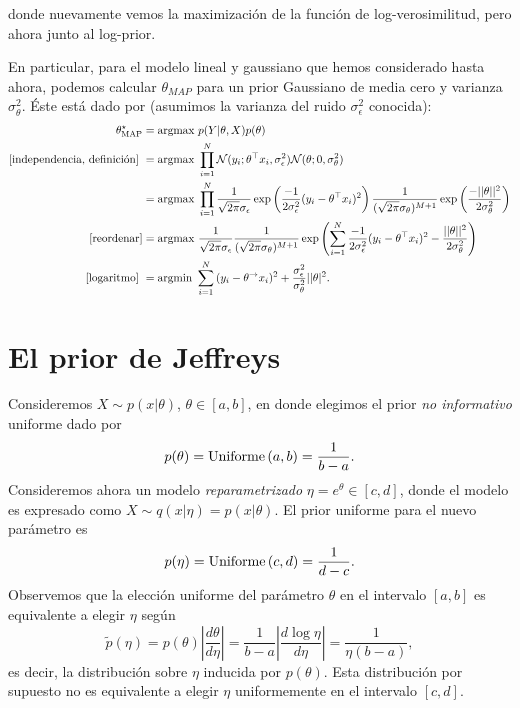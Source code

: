 donde  nuevamente vemos la maximización de  la función de log-verosimilitud, pero ahora junto al log-prior.

\begin{example}
En particular, para el modelo lineal y gaussiano que hemos considerado hasta ahora, podemos calcular $\theta_{MAP}$ para un prior Gaussiano de media cero y varianza $\sigma_\theta^2$. Éste está dado por (asumimos la varianza del ruido $\sigma_\epsilon^2$ conocida):	
\begin{align}
	\theta_\text{MAP}^\star 	&= \text{argmax } p(Y|\theta,X)p(\theta)\nonumber\\
	\text{[independencia, definición]}\ &= \text{argmax } \prod_{i=1}^N {\mathcal N}(y_i;\theta^\top x_i,\sigma_\epsilon^2){\mathcal N}(\theta;0,\sigma_\theta^2) \nonumber\\
	&= \text{argmax } \prod_{i=1}^N \frac{1}{\sqrt{2\pi}\sigma_\epsilon} \exp\left({\frac{-1}{2\sigma_\epsilon^2}(y_i-\theta^\top x_i)^2}\right)											\frac{1}{(\sqrt{2\pi}\sigma_\theta)^{M+1}} \exp\left({\frac{-||\theta||^2}{2\sigma_\theta^2}}\right) \nonumber\\
	\text{[reordenar]}  &= \text{argmax } \frac{1}{\sqrt{2\pi}\sigma_\epsilon} \frac{1}{(\sqrt{2\pi}\sigma_\theta)^{M+1}} \exp\left( \sum_{i=1}^N{\frac{-1}{2\sigma_\epsilon^2}(y_i-\theta^\top x_i)^2} -{\frac{||\theta||^2}{2\sigma_\theta^2}}\right) \nonumber\\
	\text{[logaritmo]}\  &= \text{argmin } \sum_{i=1}^N{(y_i-\theta^\to x_i)^2} +{\frac{\sigma_\epsilon^2}{\sigma_\theta^2}||\theta |^2}.\nonumber 
	\label{eq:MAP_reg_lin}
\end{align}
\end{example}




\section{El prior de Jeffreys}

Consideremos $X\sim p(x|\theta)$, $\theta \in [a,b]$, en donde elegimos el prior \textit{no informativo} uniforme dado por 
$$
	p(\theta) =\text{Uniforme}\left(a,b\right) = \frac{1}{b-a}.
$$
Consideremos ahora un modelo \textit{reparametrizado} $\eta = e^\theta\in[c,d]$, donde el modelo es expresado como $X\sim q(x|\eta) = p(x|\theta) $. El prior uniforme para el nuevo parámetro es
\begin{equation}
	p(\eta) =\text{Uniforme}\left(c,d\right) = \frac{1}{d-c}.
\end{equation}
Observemos que la elección uniforme del parámetro $\theta$ en el intervalo $[a,b]$ es equivalente a elegir $\eta$ según
\begin{equation}
	\tilde{p}(\eta) = p(\theta) \left|\frac{d\theta}{d\eta}\right| = \frac{1}{b-a}\left|\frac{d\log\eta}{d\eta}\right|= \frac{1}{\eta (b-a)},
\end{equation}
es decir, la distribución sobre $\eta$ inducida por $p(\theta)$. Esta distribución por supuesto no es equivalente a elegir $\eta$ uniformemente en el intervalo $[c,d]$. 

